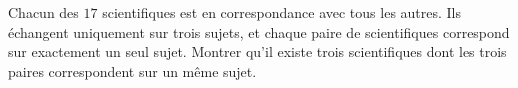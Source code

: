 Chacun des $17$ scientifiques est en correspondance avec tous les autres.
Ils échangent uniquement sur trois sujets, et chaque paire de scientifiques
correspond sur exactement un seul sujet. Montrer qu'il existe trois
scientifiques dont les trois paires correspondent sur un même sujet.
